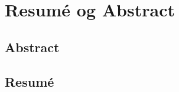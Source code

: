  
\chapter{Resumé og Abstract}
\label{chap:resume}


\section*{Abstract}






\section*{Resumé}





